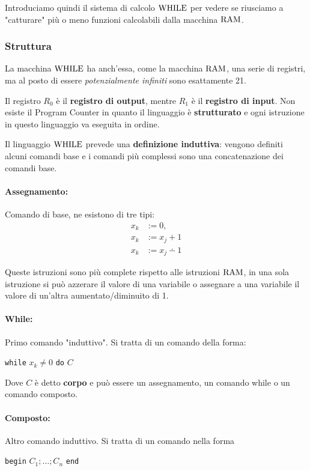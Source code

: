 Introduciamo quindi il sistema di calcolo $\text{WHILE}$ per vedere se riusciamo a "catturare" più o meno funzioni calcolabili dalla macchina $\text{RAM}$.

\subsubsection{Struttura}

La macchina $\text{WHILE}$ ha anch'essa, come la macchina $\text{RAM}$, una serie di registri, ma al posto di essere \textit{potenzialmente infiniti} sono esattamente 21. 

Il registro $R_0$ è il \textbf{registro di output}, mentre $R_1$ è il \textbf{registro di input}. Non esiste il Program Counter in quanto il linguaggio è \textbf{strutturato} e ogni istruzione in questo linguaggio va eseguita in ordine.

Il linguaggio $\text{WHILE}$ prevede una \textbf{definizione induttiva}: vengono definiti alcuni comandi base e i comandi più complessi sono una concatenazione dei comandi base.

\paragraph{Assegnamento:} Comando di base, ne esistono di tre tipi:
\begin{align*}
	x_k & := 0, \\
	x_k & := x_j + 1 \\
	x_k & := x_j \dotminus 1
\end{align*}

Queste istruzioni sono più complete rispetto alle istruzioni $\text{RAM}$, in una sola istruzione si può azzerare il valore di una variabile o assegnare a una variabile il valore di un'altra aumentato/diminuito di 1.

\paragraph{While:} Primo comando "induttivo". Si tratta di un comando della forma: 
\begin{center}
	\texttt{while} $x_k \neq 0$ \texttt{do} $C$
\end{center}

Dove $C$ è detto \textbf{corpo} e può essere un assegnamento, un comando while o un comando composto.

\paragraph{Composto:} Altro comando induttivo. Si tratta di un comando nella forma
\begin{center}
	\texttt{begin} $C_1; \dots; C_n$ \texttt{end}
\end{center}

